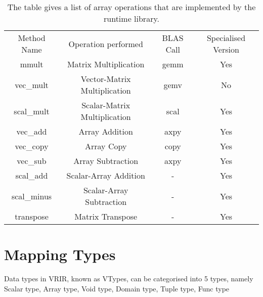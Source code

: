\begin{table}[h]
\centering
\begin{tabular}{|c|c|c|c|}
\hline
Method Name & Operation performed          & BLAS Call & Specialised Version \\ \hhline{|=|=|=|=|}
mmult       & Matrix Multiplication        & gemm      & Yes                 \\ \hline
vec\_mult   & Vector-Matrix Multiplication & gemv      & No                  \\ \hline
scal\_mult  & Scalar-Matrix Multiplication & scal      & Yes                 \\ \hline
vec\_add    & Array Addition               & axpy      & Yes                 \\ \hline
vec\_copy   & Array Copy                   & copy      & Yes                 \\ \hline
vec\_sub    & Array Subtraction            & axpy      & Yes                 \\ \hline
scal\_add   & Scalar-Array Addition        & -         & Yes                 \\ \hline
scal\_minus & Scalar-Array Subtraction     & -         & Yes                 \\ \hline
transpose   & Matrix Transpose             & -         & Yes                 \\ \hline
\end{tabular}
\caption{The table gives a list of array operations that are implemented by the runtime library.}
\label{tab:blasMethods}
\end{table} 

\section{Mapping Types}
Data types in VRIR, known as VTypes, can be categorised into 5 types, namely Scalar type, Array type,  Void type, Domain type, Tuple type, Func type
